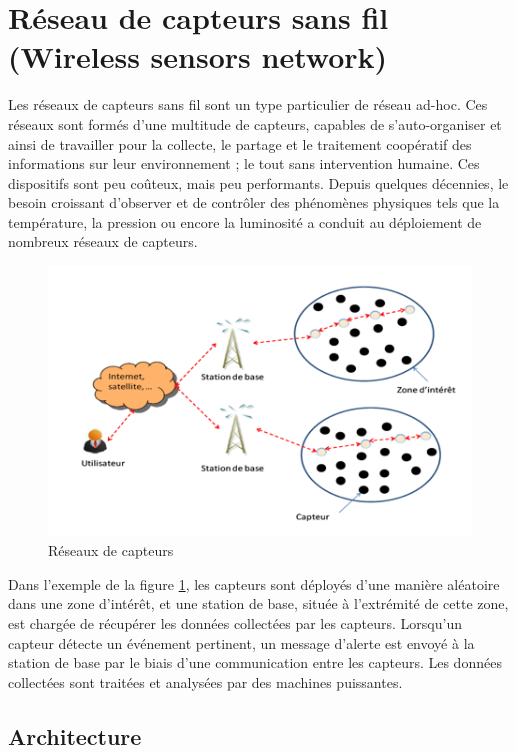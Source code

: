 \section{Réseau de capteurs sans fil (Wireless sensors network)}
Les réseaux de capteurs sans fil sont un type particulier de réseau ad-hoc. Ces réseaux sont formés d’une multitude de capteurs, capables de s’auto-organiser et ainsi de travailler pour la collecte, le partage et le traitement coopératif des informations sur leur environnement ; le tout sans intervention humaine. Ces dispositifs sont peu coûteux, mais peu performants. Depuis quelques décennies, le besoin croissant d’observer et de contrôler des phénomènes physiques tels que la température, la pression ou encore la luminosité a conduit au déploiement de nombreux réseaux de capteurs.

\begin{figure}[h]
\centering
\includegraphics[scale=0.5]{Intro/WSN}
\caption{\label{WSN} Réseaux de capteurs}
\end{figure}

Dans l'exemple de la figure \ref{WSN}, les capteurs sont déployés d’une manière aléatoire dans une zone d’intérêt, et une station de base, située à l’extrémité de cette zone, est chargée de récupérer les données collectées par les capteurs. Lorsqu’un capteur détecte un événement pertinent, un message d’alerte est envoyé à la station de base par le biais d’une  communication entre les capteurs. Les données collectées sont traitées et analysées par des machines puissantes.



\subsection{Architecture}



